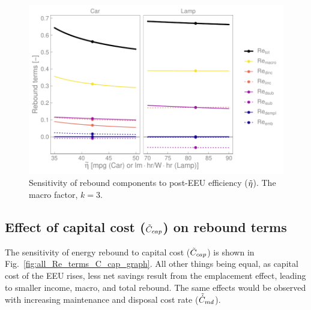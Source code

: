 \documentclass[12pt]{article}\usepackage[]{graphicx}\usepackage[]{xcolor}
\makeatletter
\def\maxwidth{ %
  \ifdim\Gin@nat@width>\linewidth
    \linewidth
  \else
    \Gin@nat@width
  \fi
}
\newenvironment{knitrout}{}{} %
\makeatother
\begin{document}
\begin{knitrout}
\color{fgcolor}\begin{figure}

{\centering \includegraphics[width=\maxwidth]{figure/all_Re_terms_eta_graph-1} 

}

\caption[Sensitivity of rebound components to post-EEU efficiency ($\amacro{\eta}$)]{Sensitivity of rebound components to post-EEU efficiency ($\amacro{\eta}$). The macro factor, $k = 3$.}\label{fig:all_Re_terms_eta_graph}
\end{figure}

\end{knitrout}


\subsection{Effect of capital cost ($\tilde{C}_{cap}$) on rebound terms} 
\label{sec:effect_of_capital_cost}

The sensitivity of energy rebound
to capital cost ($\tilde{C}_{cap}$) is shown
in Fig.~\ref{fig:all_Re_terms_C_cap_graph}.
All other things being equal,
as capital cost of the EEU rises, 
less net savings result from the emplacement effect,
leading to smaller income, macro, and total rebound.
The same effects would be observed
with increasing maintenance and disposal cost rate ($\tilde{\dot{C}}_{md}$).
\end{document}
